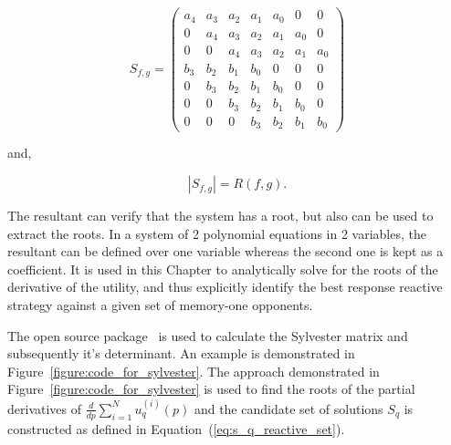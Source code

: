 \begin{equation}
S_{f,g} = \begin{pmatrix} a_{4} & a_{3} & a_{2} & a_{1} & a_{0} & 0     & 0    \\
                          0     & a_{4} & a_{3} & a_{2} & a_{1} & a_{0} & 0    \\
                          0     & 0     & a_{4} & a_{3} & a_{2} & a_{1} & a_{0} \\
                          b_{3} & b_{2} & b_{1} & b_{0} &     0 & 0     & 0     \\
                          0     & b_{3} & b_{2} & b_{1} & b_{0} & 0     & 0     \\
                          0     & 0     & b_{3} & b_{2} & b_{1} & b_{0} & 0     \\
                          0     & 0     & 0     & b_{3} & b_{2} & b_{1} & b_{0}
                        \end{pmatrix}
\end{equation}

and,

\[|S_{f, g}| = R(f, g).\]

The resultant can verify that the system has a root, but also can be
used to extract the roots. In a system of 2 polynomial equations in 2
variables, the resultant can be defined over one variable whereas the second one
is kept as a coefficient. It is used in this Chapter to analytically solve for
the roots of the derivative of the utility, and thus explicitly identify the best response
reactive strategy against a given set of memory-one opponents.

The open source package~\cite{sympy} is used to calculate the Sylvester matrix
and subsequently it's determinant. An example is demonstrated in
Figure~\ref{figure:code_for_sylvester}.
The approach demonstrated in Figure~\ref{figure:code_for_sylvester} is used to
find the roots of the partial derivatives of \(\frac{d}{dp} \sum\limits_{i=1} ^
N  u_q^{(i)}(p)\) and the candidate set of solutions \(S_q\) is constructed
as defined in Equation~(\ref{eq:s_q_reactive_set}).

